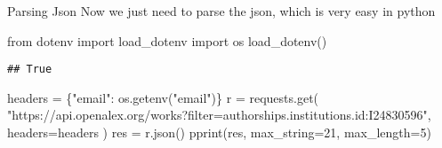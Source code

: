 \documentclass[
  10pt,
  ignorenonframetext,
  aspectratio=169]{beamer}
\newenvironment{Shaded}{\begin{snugshade}}{\end{snugshade}}
\newcommand{\DecValTok}[1]{\textcolor[rgb]{0.86,0.86,0.80}{#1}}
\newcommand{\ImportTok}[1]{\textcolor[rgb]{0.80,0.80,0.80}{#1}}
\newcommand{\NormalTok}[1]{\textcolor[rgb]{0.80,0.80,0.80}{#1}}
\newcommand{\OperatorTok}[1]{\textcolor[rgb]{0.94,0.94,0.82}{#1}}
\newcommand{\StringTok}[1]{\textcolor[rgb]{0.80,0.58,0.58}{#1}}
\begin{document}
\begin{frame}[fragile]{Parsing Json}
\protect\hypertarget{parsing-json}{}
Now we just need to parse the json, which is very easy in python

\scriptsize

\begin{Shaded}
\begin{Highlighting}[]
\ImportTok{from}\NormalTok{ dotenv }\ImportTok{import}\NormalTok{ load\_dotenv}
\ImportTok{import}\NormalTok{ os}
\NormalTok{load\_dotenv()}
\end{Highlighting}
\end{Shaded}

\begin{verbatim}
## True
\end{verbatim}

\begin{Shaded}
\begin{Highlighting}[]
\NormalTok{headers }\OperatorTok{=}\NormalTok{ \{}\StringTok{"email"}\NormalTok{: os.getenv(}\StringTok{"email"}\NormalTok{)\}}
\NormalTok{r }\OperatorTok{=}\NormalTok{ requests.get(}
  \StringTok{"https://api.openalex.org/works?filter=authorships.institutions.id:I24830596"}\NormalTok{,}
\NormalTok{  headers}\OperatorTok{=}\NormalTok{headers}
\NormalTok{)}
\NormalTok{res }\OperatorTok{=}\NormalTok{ r.json()}
\NormalTok{pprint(res, max\_string}\OperatorTok{=}\DecValTok{21}\NormalTok{, max\_length}\OperatorTok{=}\DecValTok{5}\NormalTok{)}
\end{Highlighting}
\end{Shaded}


\end{frame}
\end{document}
